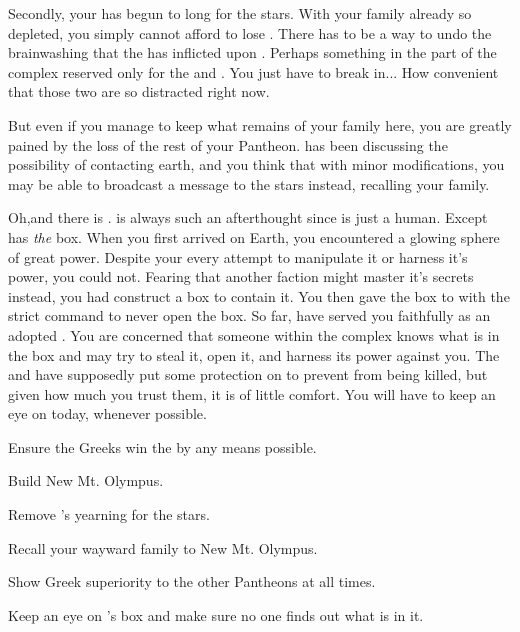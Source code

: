\documentclass[char]{guardians}
\begin{document}
Secondly, your \cAthena{\offspring} \cAthena{} has begun to long for the stars. With your family already so depleted, you simply cannot afford to lose \cAthena{\them}. There has to be a way to undo the brainwashing that the \cCaretaker{} has inflicted upon \cAthena{}. Perhaps something in the part of the complex reserved only for the \cCaretaker{} and \cWarden{}. You just have to break in... How convenient that those two are so distracted right now.

But even if you manage to keep what remains of your family here, you are greatly pained by the loss of the rest of your Pantheon.  \cHephaestus{} has been discussing the possibility of contacting earth, and you think that with minor modifications, you may be able to broadcast a message to the stars instead, recalling your family.

Oh,and there is \cPandora{}. \cPandora{\They} is always such an afterthought since \cPandora{\they} is just a human. Except \cPandora{} has \emph{the} box. When you first arrived on Earth, you encountered a glowing sphere of great power. Despite your every attempt to manipulate it or harness it's power, you could not. Fearing that another faction might master it's secrets instead, you had \cHephaestus{} construct a box to contain it. You then gave the box to \cPandora{} with the strict command to never open the box. So far, \cPandora{\they} have served you faithfully as an adopted \cPandora{\offspring}. You are concerned that someone within the complex knows what is in the box and may try to steal it, open it, and harness its power against you. The \cCaretaker{} and \cWarden{} have supposedly put some protection on \cPandora{} to prevent \cPandora{\them} from being killed, but given how much you trust them, it is of little comfort. You will have to keep an eye on \cPandora{} today, whenever possible.



\begin{itemz}[Goals]
  \item Ensure the Greeks win the \pGames{} by any means possible.
  \item Build New Mt. Olympus.
  \item Remove \cAthena{}'s yearning for the stars.
  \item Recall your wayward family to New Mt. Olympus.
  \item Show Greek superiority to the other Pantheons at all times.
  \item Keep an eye on \cPandora{}'s box and make sure no one finds out what is in it.
\end{itemz}


\begin{contacts}
  \contact{}
\end{contacts}
\end{document}
